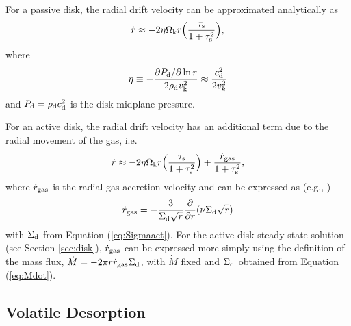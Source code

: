 \documentclass[apj]{emulateapj}
\begin{document}
For a passive disk, the radial drift velocity can be approximated analytically as
\begin{equation}
\label{eq:rdotpas}
\dot{r} \approx -2 \eta \Omega_{\rm k} r \Big(\frac{\tau_{\rm s}}{1+\tau_{\rm s}^2}\Big),
\end{equation}
where
\begin{equation}
\label{eq:eta}
\eta \equiv - \frac{\partial P_{\rm d}/\partial \ln r}{2 \rho_{\rm d} v_{\rm k}^2} \approx \frac{c_{\rm d}^2}{2 v_k^2}
\end{equation}
and $P_{\rm d} = \rho_{\rm d} c_{\rm d}^2$ is the disk midplane pressure. 

For an active disk, the radial drift velocity has an additional term due to the radial movement of the gas, i.e.
\begin{equation}
\label{eq:rdotact}
\dot{r} \approx -2 \eta \Omega_{\rm k} r \Big(\frac{\tau_{\rm s}}{1+\tau_{\rm s}^2}\Big) + \frac{\dot{r}_{\rm gas}}{1+\tau_{\rm s}^2},
\end{equation}
where $\dot{r}_{\rm gas}$ is the radial gas accretion velocity and can be expressed as (e.g., \citealt{fkr02})
\begin{equation}
\label{eq:vgas}
\dot{r}_{\rm gas} = - \frac{3}{\Sigma_{\rm d} \sqrt{r}} \frac{\partial}{\partial r}(\nu \Sigma_{\rm d} \sqrt{r}) 
\end{equation}
with $\Sigma_{\rm d}$ from Equation (\ref{eq:Sigmaact}). For the active disk steady-state solution (see Section \ref{sec:disk}), $\dot{r}_{\rm gas}$ can be expressed more simply using the definition of the mass flux, $\dot{M}=-2 \pi r \dot{r}_{\rm gas} \Sigma_{\rm d}$, with $\dot{M}$ fixed and $\Sigma_{\rm d}$ obtained from Equation (\ref{eq:Mdot}). 

\subsection{Volatile Desorption}
\label{sec:desorption}

\end{document}
